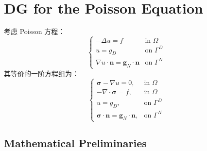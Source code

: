 \section{DG for the Poisson Equation}

考虑 Poisson 方程：
\begin{equation}\label{Poisson primal form}
	\begin{cases}
		-\Delta u = f & \text{in \(\Omega\)} \\
		u = g_{D} & \text{on \(\Gamma^{D}\)} \\
		\nabla u \cdot \bm n = \bm g_{N} \cdot \bm n & \text{on \(\Gamma^{N}\)}
	\end{cases}
\end{equation}
其等价的一阶方程组为：
\begin{equation}\label{Poisson mixed form}
	\begin{cases}
		\bm\sigma - \nabla u = 0, & \text{in \(\Omega\)} \\
		-\nabla \cdot \bm\sigma = f, & \text{in \(\Omega\)} \\
		u = g_{D}, & \text{on \(\Gamma^{D}\)} \\
		\bm\sigma \cdot \bm n = \bm g_{N} \cdot \bm n, & \text{on \(\Gamma^{N}\)}
	\end{cases}
\end{equation}


\subsection{Mathematical Preliminaries}




